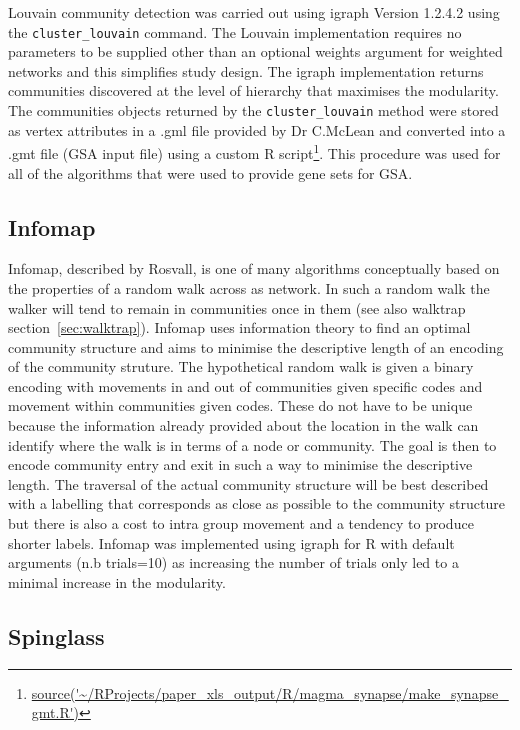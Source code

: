Louvain community detection was carried out using igraph Version 1.2.4.2 using the \texttt{cluster\_louvain} command. The Louvain implementation requires no parameters to be supplied other than an optional weights argument for weighted networks and this simplifies study design. The igraph implementation returns communities discovered at the level of hierarchy that maximises the modularity. The communities objects returned by the \texttt{cluster\_louvain} method were stored as vertex attributes in a .gml file provided by Dr C.McLean and converted into a .gmt file (GSA input file) using a custom R script\footnote{\url{source('~/RProjects/paper_xls_output/R/magma_synapse/make_synapse_gmt.R')}}. This procedure was used for all of the algorithms that were used to provide gene sets for GSA. 

\subsection{Infomap}
\label{sec:Infomap}

Infomap, described by Rosvall, is one of many algorithms conceptually based on the properties of a random walk across as network\cite{rosvall2008maps}. In such a random walk the walker will tend to remain in communities once in them (see also walktrap section~\ref{sec:walktrap}). Infomap uses information theory to find an optimal community structure and aims to minimise the descriptive length of an encoding of the community struture. The hypothetical random walk is given a binary encoding with movements in and out of communities given specific codes and movement within communities given codes. These do not have to be unique because the information already provided about the location in the walk can identify where the walk is in terms of a node or community. The goal is then to encode community entry and exit in such a way to minimise the descriptive length. The traversal of the actual community structure will be best described with a labelling that corresponds as close as possible to the community structure but there is also a cost to intra group movement and a tendency to produce shorter labels. Infomap was implemented using igraph for R with default arguments (n.b trials=10) as increasing the number of trials only led to a minimal increase in the modularity. 

\subsection{Spinglass}
\label{sec:spinglass}

